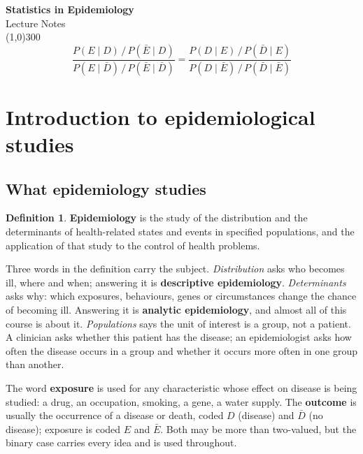 \documentclass[11pt,a4paper]{article}
\numberwithin{equation}{section}
\theoremstyle{definition}
\newtheorem{defn}[thm]{Definition}
\begin{document}
\begin{titlepage}
\thispagestyle{empty}
\begin{center}
\vspace*{3cm}
{\Huge\bfseries Statistics in Epidemiology}\\[1.2cm]
{\large Lecture Notes}\\[2.5cm]
\line(1,0){300}\\[1.5cm]
$$\frac{P(E \mid D)\,/\,P(\bar E \mid D)}{P(E \mid \bar D)\,/\,P(\bar E \mid \bar D)} = \frac{P(D \mid E)\,/\,P(\bar D \mid E)}{P(D \mid \bar E)\,/\,P(\bar D \mid \bar E)}$$
\end{center}
\end{titlepage}

\tableofcontents
\thispagestyle{empty}
\clearpage
\setcounter{page}{1}

\section{Introduction to epidemiological studies}
\label{sec:intro}

\subsection{What epidemiology studies}

\begin{defn}
\textbf{Epidemiology} is the study of the distribution and the determinants of health-related states and events in
specified populations, and the application of that study to the control of health problems.
\end{defn}

Three words in the definition carry the subject. \emph{Distribution} asks who becomes ill, where and when; answering it is \textbf{descriptive
epidemiology}. \emph{Determinants} asks why: which exposures, behaviours, genes or circumstances change the chance of becoming ill. Answering
it is \textbf{analytic epidemiology}, and almost all of this course is about it. \emph{Populations} says the unit of interest is a group, not a
patient. A clinician asks whether this patient has the disease; an epidemiologist asks how often the disease occurs in a group and whether
it occurs more often in one group than another.

The word \textbf{exposure} is used for any characteristic whose effect on disease is being studied: a drug, an occupation, smoking, a gene,
a water supply. The \textbf{outcome} is usually the occurrence of a disease or death, coded $D$ (disease) and $\bar D$ (no disease); exposure
is coded $E$ and $\bar E$. Both may be more than two-valued, but the binary case carries every idea and is used throughout.
\end{document}
